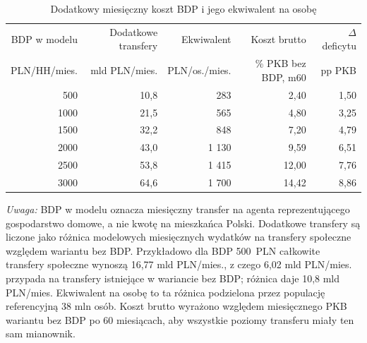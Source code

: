 \begin{table}[H]
\centering
\scriptsize
\caption{Dodatkowy miesięczny koszt BDP i jego ekwiwalent na osobę}
\label{tab:per-capita-equivalents}
\begin{tabular}{@{}rrrrr@{}}
\toprule
BDP w modelu & Dodatkowe transfery & Ekwiwalent & Koszt brutto & \(\Delta\) deficytu \\
PLN/HH/mies. & mld PLN/mies. & PLN/os./mies. & \% PKB bez BDP, m60 & pp PKB \\
\midrule
500  & 10,8 & 283   & 2,40  & 1,50 \\
1000 & 21,5 & 565   & 4,80  & 3,25 \\
1500 & 32,2 & 848   & 7,20  & 4,79 \\
2000 & 43,0 & 1 130 & 9,59  & 6,51 \\
2500 & 53,8 & 1 415 & 12,00 & 7,76 \\
3000 & 64,6 & 1 700 & 14,42 & 8,86 \\
\bottomrule
\end{tabular}
\vspace{0.25em}

\parbox{\textwidth}{\scriptsize \textit{Uwaga:} BDP w modelu oznacza miesięczny transfer na agenta reprezentującego gospodarstwo domowe, a nie kwotę na mieszkańca Polski. Dodatkowe transfery są liczone jako różnica modelowych miesięcznych wydatków na transfery społeczne względem wariantu bez BDP. Przykładowo dla BDP 500~PLN całkowite transfery społeczne wynoszą 16,77 mld PLN/mies., z czego 6,02 mld PLN/mies. przypada na transfery istniejące w wariancie bez BDP; różnica daje 10,8 mld PLN/mies. Ekwiwalent na osobę to ta różnica podzielona przez populację referencyjną 38 mln osób. Koszt brutto wyrażono względem miesięcznego PKB wariantu bez BDP po 60 miesiącach, aby wszystkie poziomy transferu miały ten sam mianownik.}
\end{table}
